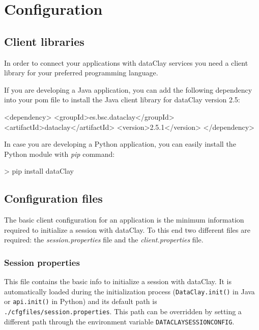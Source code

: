 
\chapter{Configuration}

\section{Client libraries}
\label{sec:ClientLibraries}

In order to connect your applications with dataClay services you need a client library for your preferred programming language.

If you are developing a Java application, you can add the following dependency into your pom file to install the Java client library for dataClay version 2.5:

\begin{tBox}
\footnotesize
 \begin{bash}
  <dependency>
    <groupId>es.bsc.dataclay</groupId>
    <artifactId>dataclay</artifactId>
    <version>2.5.1</version>
  </dependency>
 \end{bash}
\end{tBox}

In case you are developing a Python application, you can easily install the Python module with \textit{pip} command:

\begin{tBox}
\begin{bash}
> pip install dataClay
\end{bash}
\end{tBox}

\section{Configuration files}
\label{sec:ClientConfigFiles}

The basic client configuration for an application is the minimum information required to initialize a session with dataClay. To this end two different files are required: the \textit{session.properties} file and the \textit{client.properties} file.

\subsection{Session properties}
This file contains the basic info to initialize a session with dataClay. It is automatically loaded during the initialization process (\texttt{DataClay.init()} in Java or \texttt{api.init()} in Python) and its default path is \texttt{./cfgfiles/session.properties}. This path can be overridden by setting a different path through the environment variable \texttt{DATACLAYSESSIONCONFIG}. 

